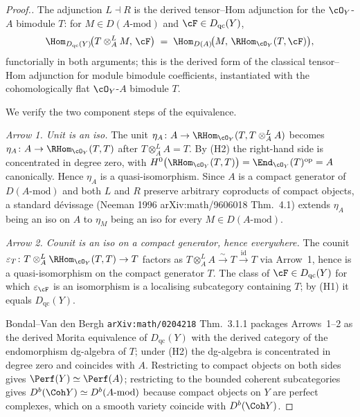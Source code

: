 \begin{proof}[Proof.]
The adjunction $L \dashv R$ is the derived tensor--Hom adjunction for the $\cO_Y$-$A$ bimodule $T$: for $M \in D(A\text{-}\mathrm{mod})$ and $\cF \in D_{\mathrm{qc}}(Y)$,
\[
 \Hom_{D_{\mathrm{qc}}(Y)}\!\bigl(T \otimes^{L}_{A} M,\, \cF\bigr)
 \;=\;
 \Hom_{D(A)}\!\bigl(M,\, \RHom_{\cO_Y}(T, \cF)\bigr),
\]
functorially in both arguments; this is the derived form of the classical tensor--Hom adjunction for module bimodule coefficients, instantiated with the cohomologically flat $\cO_Y$-$A$ bimodule $T$.

We verify the two component steps of the equivalence.

\emph{Arrow 1. Unit is an iso.} The unit $\eta_A \colon A \to \RHom_{\cO_Y}(T, T \otimes^{L}_{A} A)$ becomes $\eta_A \colon A \to \RHom_{\cO_Y}(T, T)$ after $T \otimes^{L}_{A} A = T$. By (H2) the right-hand side is concentrated in degree zero, with $H^{0}\bigl(\RHom_{\cO_Y}(T, T)\bigr) = \End_{\cO_Y}(T)^{\mathrm{op}} = A$ canonically. Hence $\eta_A$ is a quasi-isomorphism. Since $A$ is a compact generator of $D(A\text{-}\mathrm{mod})$ and both $L$ and $R$ preserve arbitrary coproducts of compact objects, a standard dévissage (Neeman 1996 arXiv:math/9606018 Thm.~4.1) extends $\eta_A$ being an iso on $A$ to $\eta_M$ being an iso for every $M \in D(A\text{-}\mathrm{mod})$.

\emph{Arrow 2. Counit is an iso on a compact generator, hence everywhere.} The counit $\varepsilon_{T} \colon T \otimes^{L}_{A} \RHom_{\cO_Y}(T, T) \to T$ factors as $T \otimes^{L}_{A} A \xrightarrow{\sim} T \xrightarrow{\mathrm{id}} T$ via Arrow~1, hence is a quasi-isomorphism on the compact generator $T$. The class of $\cF \in D_{\mathrm{qc}}(Y)$ for which $\varepsilon_{\cF}$ is an isomorphism is a localising subcategory containing $T$; by (H1) it equals $D_{\mathrm{qc}}(Y)$.

Bondal--Van den Bergh \texttt{arXiv:math/0204218} Thm.~3.1.1 packages Arrows~1--2 as the derived Morita equivalence of $D_{\mathrm{qc}}(Y)$ with the derived category of the endomorphism dg-algebra of $T$; under (H2) the dg-algebra is concentrated in degree zero and coincides with $A$. Restricting to compact objects on both sides gives $\Perf(Y) \simeq \Perf(A)$; restricting to the bounded coherent subcategories gives $D^{b}(\Coh Y) \simeq D^{b}(A\text{-}\mathrm{mod})$ because compact objects on $Y$ are perfect complexes, which on a smooth variety coincide with $D^{b}(\Coh Y)$.
\end{proof}

